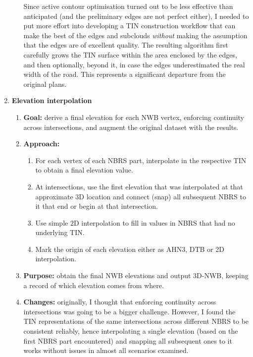 \begin{enumerate}
\begin{enumerate}
        Since active contour optimisation turned out to be less effective than anticipated (and the preliminary edges are not perfect either), I needed to put more effort into developing a TIN construction workflow that can make the best of the edges and subclouds \textit{without} making the assumption that the edges are of excellent quality. The resulting algorithm first carefully grows the TIN surface within the area enclosed by the edges, and then optionally, beyond it, in case the edges underestimated the real width of the road. This represents a significant departure from the original plans.
    \end{enumerate}
    \item \textbf{Elevation interpolation}
    \begin{enumerate}
        \item \textbf{Goal:} derive a final elevation for each NWB vertex, enforcing continuity across intersections, and augment the original dataset with the results.
        \item \textbf{Approach:}
        \begin{enumerate}
            \item For each vertex of each NBRS part, interpolate in the respective TIN to obtain a final elevation value.
            \item At intersections, use the first elevation that was interpolated at that approximate 3D location and connect (snap) all subsequent NBRS to it that end or begin at that intersection.
            \item Use simple 2D interpolation to fill in values in NBRS that had no underlying TIN.
            \item Mark the origin of each elevation either as AHN3, DTB or 2D interpolation.
        \end{enumerate}
        \item \textbf{Purpose:} obtain the final NWB elevations and output 3D-NWB, keeping a record of which elevation comes from where.
        \item \textbf{Changes:} originally, I thought that enforcing continuity across intersections was going to be a bigger challenge. However, I found the TIN representations of the same intersections across different NBRS to be consistent reliably, hence interpolating a single elevation (based on the first NBRS part encountered) and snapping all subsequent ones to it works without issues in almost all scenarios examined.
    \end{enumerate}
\end{enumerate}

